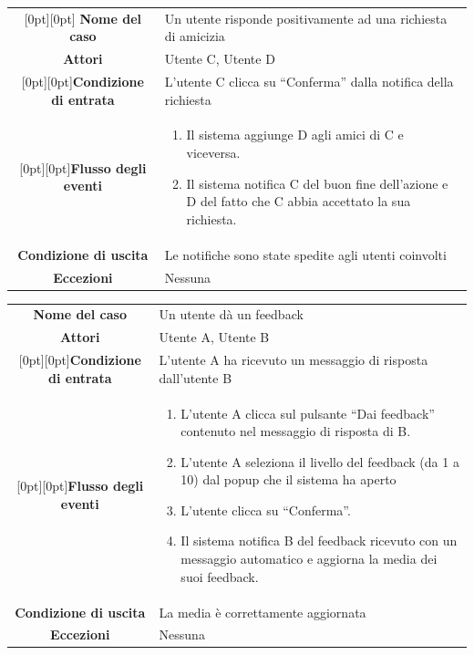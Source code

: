 \documentclass[a4paper,12pt]{article}
\begin{document}
\begin{tabularx}{\textwidth}{|c|X|}
\rowcolor[gray]{.9}\hline \raisebox{-1ex}[0pt][0pt]{ \textbf{Nome del caso}} & Un utente risponde positivamente ad una richiesta di amicizia \\
\rowcolor[gray]{.9}\hline  \textbf{Attori} & Utente C, Utente D \\ 
\rowcolor[gray]{.9}\hline  \raisebox{-1ex}[0pt][0pt]{\textbf{Condizione di entrata}} & L'utente C clicca su “Conferma” dalla notifica della richiesta \\
\rowcolor[gray]{.9}\hline  \raisebox{-5.5ex}[0pt][0pt]{\textbf{Flusso degli eventi}} & 
\begin{enumerate}
\itemsep0em 
\item Il sistema aggiunge D agli amici di C e viceversa.
\item Il sistema notifica C del buon fine dell'azione e D del fatto che C abbia accettato la sua richiesta.
\end{enumerate}
 \\ 
\rowcolor[gray]{.9}\hline  \textbf{Condizione di uscita} & Le notifiche sono state spedite agli utenti coinvolti \\
\rowcolor[gray]{.9}\hline  \textbf{Eccezioni}& Nessuna
\\
\hline 
\end{tabularx}
\clearpage
\begin{tabularx}{\textwidth}{|c|X|}
\rowcolor[gray]{.9}\hline  \textbf{Nome del caso} & Un utente dà un feedback \\
\rowcolor[gray]{.9}\hline  \textbf{Attori} & Utente A, Utente B \\ 
\rowcolor[gray]{.9}\hline  \raisebox{-1ex}[0pt][0pt]{\textbf{Condizione di entrata}} & L'utente A ha ricevuto un messaggio di risposta dall'utente B \\
\rowcolor[gray]{.9}\hline  \raisebox{-12ex}[0pt][0pt]{\textbf{Flusso degli eventi}} & 
\begin{enumerate}
\itemsep0em 
\item L'utente A clicca sul pulsante “Dai feedback” contenuto nel messaggio di risposta di B.
\item L'utente A seleziona il livello del feedback (da 1 a 10) dal popup che il sistema ha aperto
\item L'utente clicca su “Conferma”.
\item Il sistema notifica B del feedback ricevuto con un messaggio automatico e aggiorna la media dei suoi feedback.
\end{enumerate}
 \\ 
\rowcolor[gray]{.9}\hline  \textbf{Condizione di uscita} & La media è correttamente aggiornata \\
\rowcolor[gray]{.9}\hline  \textbf{Eccezioni} & Nessuna
\\
\hline 
\end{tabularx} \\[3\baselineskip]
\end{document}
